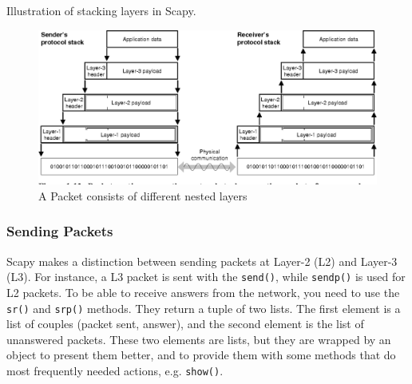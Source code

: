 \documentclass[11pt,a4paper]{article}
\begin{document}
\begin{listing}[h]
\inputminted{python}{../code_students/example_stacking_layers.py}
\caption{Illustration of stacking layers in Scapy.}%
\label{listing:stacking-layers}
\end{listing}



\begin{figure}
    \centering
    \includegraphics[width=\textwidth]{packet_layered.png}
    \caption{A Packet consists of different nested layers}%
    \label{fig:nested_layers_packet}
\end{figure}


 \subsubsection{Sending Packets}
 Scapy makes a distinction between sending packets at Layer-2 (L2) and Layer-3 (L3). For instance, a L3 packet is sent with the \texttt{send()}, while \texttt{sendp()} is used for L2 packets. To be able to receive answers from the network, you need to use the \texttt{sr()} and \texttt{srp()} methods. They return a tuple of two lists. The first element is a list of couples (packet sent, answer), and the second element is the list of unanswered packets. These two elements are lists, but they are wrapped by an object to present them better, and to provide them with some methods that do most frequently needed actions, e.g. \texttt{show()}.
 
\end{document}
